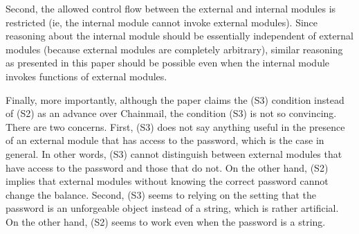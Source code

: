\documentclass[11pt]{amsart}
\begin{document}
Second, the allowed control flow between the external and internal modules is restricted (ie, the internal module cannot invoke external modules). Since reasoning about the internal module should be essentially independent of external modules (because external modules are completely arbitrary), similar reasoning as presented in this paper should be possible even when the internal module invokes functions of external modules.

Finally, more importantly, although the paper claims the (S3) condition instead of (S2) as an advance over Chainmail, the condition (S3) is not so convincing. There are two concerns. First, (S3) does not say anything useful in the presence of an external module that has access to the password, which is the case in general. In other words, (S3) cannot distinguish between external modules that have access to the password and those that do not. On the other hand, (S2) implies that external modules without knowing the correct password cannot change the balance. Second, (S3) seems to relying on the setting that the password is an unforgeable object instead of a string, which is rather artificial. On the other hand, (S2) seems to work even when the password is a string.



 
\end{document}

